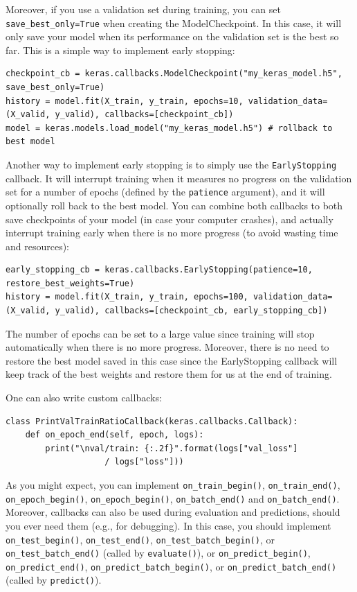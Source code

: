 \documentclass[12pt, letterpaper]{article}
\theoremstyle{definition}
\let\cd\lstinline
\begin{document}
Moreover, if you use a validation set during training, you can set \lstinline+save_best_only=True+ when creating the ModelCheckpoint. In this case, it will only save your model when its performance on the validation set is the best so far. This is a simple way to implement early stopping:
\begin{lstlisting}
checkpoint_cb = keras.callbacks.ModelCheckpoint("my_keras_model.h5", save_best_only=True)
history = model.fit(X_train, y_train, epochs=10, validation_data=(X_valid, y_valid), callbacks=[checkpoint_cb])
model = keras.models.load_model("my_keras_model.h5") # rollback to best model
\end{lstlisting}

Another way to implement early stopping is to simply use the \cd+EarlyStopping+ callback. It will interrupt training when it measures no progress on the validation set for a number of epochs (defined by the \cd+patience+ argument), and it will optionally roll back to the best model. You can combine both callbacks to both save checkpoints of your model (in case your computer crashes), and actually interrupt training early when there is no more progress (to avoid wasting time and resources):

\begin{lstlisting}
early_stopping_cb = keras.callbacks.EarlyStopping(patience=10, restore_best_weights=True)
history = model.fit(X_train, y_train, epochs=100, validation_data=(X_valid, y_valid), callbacks=[checkpoint_cb, early_stopping_cb])
\end{lstlisting}
The number of epochs can be set to a large value since training will stop automatically when there is no more progress. Moreover, there is no need to restore the best model saved in this case since the EarlyStopping callback will keep track of the best weights and restore them for us at the end of training.

One can also write custom callbacks:
\begin{lstlisting}
class PrintValTrainRatioCallback(keras.callbacks.Callback): 
    def on_epoch_end(self, epoch, logs):
        print("\nval/train: {:.2f}".format(logs["val_loss"] 
        			/ logs["loss"]))
\end{lstlisting}

As you might expect, you can implement \lstinline+on_train_begin()+, \lstinline+on_train_end()+, \lstinline+on_epoch_begin()+, \lstinline+on_epoch_begin()+, \lstinline+on_batch_end()+ and \lstinline+on_batch_end()+. Moreover, callbacks can also be used during evaluation and predictions, should you ever need them (e.g., for debugging). In this case, you should implement \lstinline+on_test_begin()+, \lstinline+on_test_end()+, \lstinline+on_test_batch_begin()+, or \lstinline+on_test+\lstinline+_batch+\lstinline+_end()+ (called by \lstinline+evaluate()+), or \lstinline+on_predict_begin()+, \lstinline+on_predict_end()+, \lstinline+on_+\lstinline+predict+\lstinline+_batch_begin()+, or \lstinline+on_predict_batch+\lstinline+_end()+ (called by \lstinline+predict()+).
\end{document}
